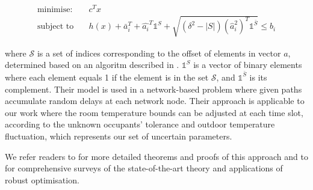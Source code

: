 \begingroup
\begin{align*}
\mbox{minimise:} \quad &c^Tx	\\
\mbox{subject to} \quad &h(x) + \bar{a}_i^T + \hat{a_i}^T \mathbb{1}^S + \sqrt{\left(\delta^2 - \left|S\right|\right) \left(\hat{a}_i^2\right)^T \mathbb{1}^{\bar{S}}}  \leq b_i  
\end{align*}
\endgroup

\noindent where $\mathcal{S}$ is a set of indices corresponding to the offset of elements in vector $a$, determined based on an algoritm described in \cite[Proposition 1.]{hijazi2013robust}. $\mathbb{1}^S$ is a vector of binary elements where each element equals 1 if the element is in the set $\mathcal{S}$, and $\mathbb{1}^{\bar{S}}$ is its complement. Their model is used in a network-based problem where given paths accumulate random delays at each network node. Their approach is applicable to our work where the room temperature bounds can be adjusted at each time slot, according to the unknown occupants' tolerance and outdoor temperature fluctuation, which represents our set of uncertain parameters.%

We refer readers to \citep{Elgh97,BenT98,BenT99,babonneau2009robust,hijazi2013robust} for more detailed theorems and proofs of this approach and to \cite{bertsimas2011theory,gabrel2014recent} for comprehensive surveys of the state-of-the-art theory and applications of robust optimisation. 


